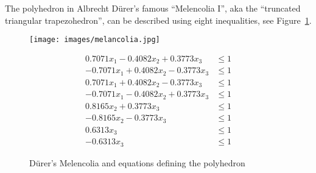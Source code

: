 \begin{example}\label{ex:durer}
 The polyhedron in Albrecht D\"urer's famous ``Melencolia I'', aka the ``truncated triangular trapezohedron'', can be described using eight inequalities, see Figure~\ref{fig:melen}.
 
 \begin{figure}[h!]
 \centering
 \begin{minipage}{0.5\textwidth}
 \centering
  \texttt{[image: images/melancolia.jpg]}
 \end{minipage}%
 \begin{minipage}{0.45\textwidth}
\begin{align*}
    0.7071x_1   -0.4082x_2 +  0.3773x_3 & \leq 1\\
   -0.7071x_1 +   0.4082x_2  -0.3773x_3 & \leq 1\\
    0.7071x_1 +   0.4082x_2  -0.3773x_3 & \leq 1\\
   -0.7071x_1   -0.4082x_2 +  0.3773x_3 & \leq 1\\
                  0.8165x_2 +  0.3773x_3 & \leq 1\\
                 -0.8165x_2  -0.3773x_3 & \leq 1\\
                               0.6313x_3 & \leq 1\\
                              -0.6313x_3 & \leq 1
\end{align*}
\end{minipage}
\caption{D\"urer's Melencolia and equations defining the polyhedron}\label{fig:melen}
\end{figure}
\end{example}

